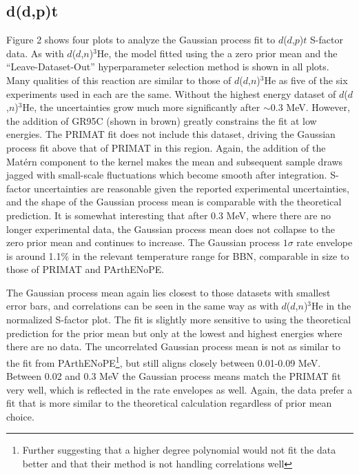 \documentclass[%
 reprint,
superscriptaddress,
nofootinbib,
 amsmath,amssymb,
 aps,
 pra,
]{revtex4-2}
\begin{document}
\subsection{d(d,p)t}

Figure 2 shows four plots to analyze the Gaussian process fit to $d$($d$,$p$)$t$ S-factor data. As with $d$($d$,$n$)$^3$He, the model fitted using the a zero prior mean and the ``Leave-Dataset-Out''  hyperparameter selection method is shown in all plots. Many qualities of this reaction are similar to those of $d$($d$,$n$)$^3$He as five of the six experiments used in each are the same. Without the highest energy dataset of $d$($d$,$n$)$^3$He, the uncertainties grow much more significantly after $\sim0.3$ MeV. However, the addition of GR95C (shown in brown) greatly constrains the fit at low energies. The PRIMAT fit does not include this dataset, driving the Gaussian process fit above that of PRIMAT in this region. Again, the addition of the Mat\'ern component to the kernel makes the mean and subsequent sample draws jagged with small-scale fluctuations which become smooth after integration. S-factor uncertainties are reasonable given the reported experimental uncertainties, and the shape of the Gaussian process mean is comparable with the theoretical prediction. It is somewhat interesting that after 0.3 MeV, where there are no longer experimental data, the Gaussian process mean does not collapse to the zero prior mean and continues to increase. The Gaussian process $1\sigma$ rate envelope is around 1.1\% in the relevant temperature range for BBN, comparable in size to those of PRIMAT and PArthENoPE.

The Gaussian process mean again lies closest to those datasets with smallest error bars, and correlations can be seen in the same way as with $d$($d$,$n$)$^3$He in the normalized S-factor plot. The fit is slightly more sensitive to using the theoretical prediction for the prior mean but only at the lowest and highest energies where there are no data. The uncorrelated Gaussian process mean is not as similar to the fit from PArthENoPE\footnote{Further suggesting that a higher degree polynomial would not fit the data better and that their method is not handling correlations well}, but still aligns closely between 0.01-0.09 MeV. Between 0.02 and 0.3 MeV the Gaussian process means match the PRIMAT fit very well, which is reflected in the rate envelopes as well. Again, the data prefer a fit that is more similar to the theoretical calculation regardless of prior mean choice.
\end{document}
